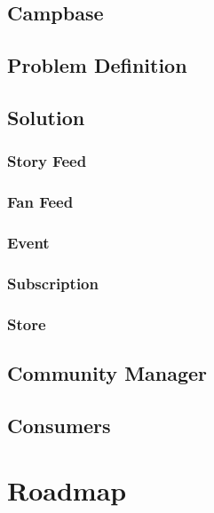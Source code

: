 \documentclass[letterpaper,11pt]{article}
\begin{document}
\subsection{Campbase}

\subsection{Problem Definition}

\subsection{Solution}

\subsubsection{Story Feed}

\subsubsection{Fan Feed}

\subsubsection{Event}

\subsubsection{Subscription}

\subsubsection{Store}

\subsection{Community Manager}

\subsection{Consumers}

\section{Roadmap}



\end{document}
